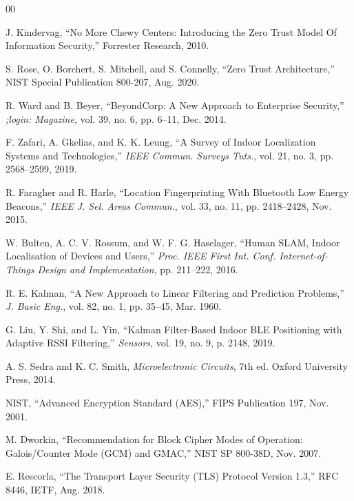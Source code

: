 \documentclass[conference]{IEEEtran}
\begin{document}
\begin{thebibliography}{00}

J. Kindervag, ``No More Chewy Centers: Introducing the Zero Trust Model Of Information Security,'' Forrester Research, 2010.

S. Rose, O. Borchert, S. Mitchell, and S. Connelly, ``Zero Trust Architecture,'' NIST Special Publication 800-207, Aug. 2020.

R. Ward and B. Beyer, ``BeyondCorp: A New Approach to Enterprise Security,'' \textit{;login: Magazine}, vol. 39, no. 6, pp. 6--11, Dec. 2014.

F. Zafari, A. Gkelias, and K. K. Leung, ``A Survey of Indoor Localization Systems and Technologies,'' \textit{IEEE Commun. Surveys Tuts.}, vol. 21, no. 3, pp. 2568--2599, 2019.

R. Faragher and R. Harle, ``Location Fingerprinting With Bluetooth Low Energy Beacons,'' \textit{IEEE J. Sel. Areas Commun.}, vol. 33, no. 11, pp. 2418--2428, Nov. 2015.

W. Bulten, A. C. V. Rossum, and W. F. G. Haselager, ``Human SLAM, Indoor Localisation of Devices and Users,'' \textit{Proc. IEEE First Int. Conf. Internet-of-Things Design and Implementation}, pp. 211--222, 2016.

R. E. Kalman, ``A New Approach to Linear Filtering and Prediction Problems,'' \textit{J. Basic Eng.}, vol. 82, no. 1, pp. 35--45, Mar. 1960.

G. Liu, Y. Shi, and L. Yin, ``Kalman Filter-Based Indoor BLE Positioning with Adaptive RSSI Filtering,'' \textit{Sensors}, vol. 19, no. 9, p. 2148, 2019.

A. S. Sedra and K. C. Smith, \textit{Microelectronic Circuits}, 7th ed. Oxford University Press, 2014.

NIST, ``Advanced Encryption Standard (AES),'' FIPS Publication 197, Nov. 2001.

M. Dworkin, ``Recommendation for Block Cipher Modes of Operation: Galois/Counter Mode (GCM) and GMAC,'' NIST SP 800-38D, Nov. 2007.

E. Rescorla, ``The Transport Layer Security (TLS) Protocol Version 1.3,'' RFC 8446, IETF, Aug. 2018.


\end{thebibliography}
\end{document}
